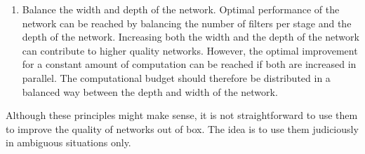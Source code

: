 \begin{enumerate}
\item Balance the width and depth of the network. Optimal performance of the network can be reached by balancing the number of filters per stage and the depth of the network. Increasing both the width and the depth of the network can contribute to higher quality networks. However, the optimal improvement for a constant amount of computation can be reached if both are increased in parallel. The computational budget should therefore be distributed in a balanced way between the depth and width of the network. \label{balance}
\end{enumerate}

Although these principles might make sense, it is not straightforward to use
them to improve the quality of networks out of box. The idea is to use them
judiciously in ambiguous situations only.
